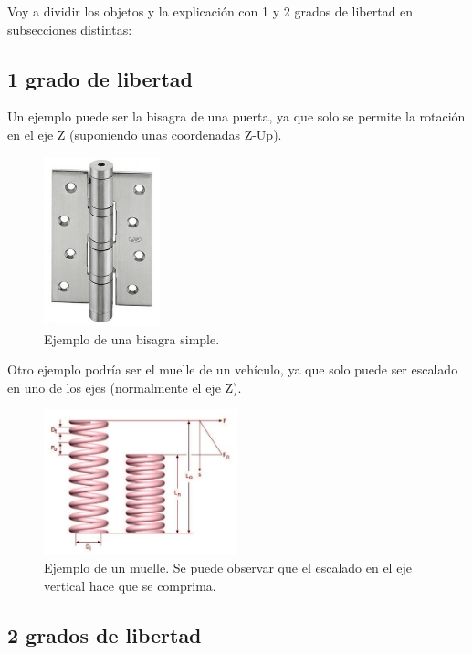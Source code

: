 \documentclass[]{article}
\begin{document}
Voy a dividir los objetos y la explicación con 1 y 2 grados de libertad en subsecciones distintas:

\subsection{1 grado de libertad}

Un ejemplo puede ser la bisagra de una puerta, ya que solo se permite la rotación en el eje Z (suponiendo unas coordenadas Z-Up).

\begin{figure}[H]
   \centering
   \includegraphics[width=0.3\textwidth]{imagenes/bisagra.jpeg}
   \caption{Ejemplo de una bisagra simple\cite{bisagra}.}
\end{figure}

Otro ejemplo podría ser el muelle de un vehículo, ya que solo puede ser escalado en uno de los ejes (normalmente el eje Z).

\begin{figure}[H]
   \centering
   \includegraphics[width=0.5\textwidth]{imagenes/muelle.jpg}
   \caption{Ejemplo de un muelle. Se puede observar que el escalado en el eje vertical hace que se comprima\cite{muelle}.}
\end{figure}

\subsection{2 grados de libertad}
\end{document}
